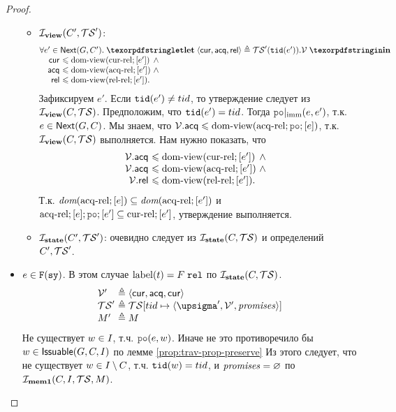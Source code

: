 \begin{proof}
\begin{itemize}
\begin{itemize}
        \item $\mathcal{I}_{\rm \bf view}(C', \mathcal{TS}')$:
          \[\inarr{
  \forall e' \in \nextset(G, C'). \; \letdef{\tup{\viewCur, \viewAcq, \viewfRel}}{\TSf'(\lTID(e')).\View}\\
  \quad
  \begin{array}{@{}r@{~}l@{~}l}
    \viewCur  & \le \domView(\curRel; [e']) & \land {} \\
    \viewAcq  & \le \domView(\acqRel; [e']) & \land {} \\
    \viewfRel & \le \domView(\relRel; [e']). \\
  \end{array}
          }\]
          Зафиксируем $e'$. Если ${\mathtt{tid}}(e') \neq tid$, то утверждение следует из $\mathcal{I}_{\rm \bf view}(C, \mathcal{TS})$.
          Предположим, что ${\mathtt{tid}}(e') = tid$. Тогда $\imm{\lPO}(e, e')$, т.к. $e \in {\sf Next}(G, C)$.
          Мы знаем, что $\View.\viewAcq \le \domView(\acqRel; \lPO; [e])$, т.к. $\mathcal{I}_{\rm \bf view}(C, \mathcal{TS})$ выполняется.
          Нам нужно показать, что
          \[\inarr{
  \begin{array}{@{}r@{~}l@{~}l}
    \View.\viewAcq  & \le \domView(\curRel; [e']) & \land {} \\
    \View.\viewAcq  & \le \domView(\acqRel; [e']) & \land {} \\
    \View.\viewfRel & \le \domView(\relRel; [e']). \\
  \end{array}
          }\]
          Т.к. $\textit{dom}{({{\rm acq\text{-}rel}; [e]})} \subseteq \textit{dom}{({{\rm acq\text{-}rel}; [e']})}$
          и $\acqRel;[e];\lPO;[e'] \suq \curRel; [e']$, утверждение выполняется.
        \item $\mathcal{I}_{\rm \bf state}(C', \mathcal{TS}')$:
          очевидно следует из $\mathcal{I}_{\rm \bf state}(C, \mathcal{TS})$ и определений $C', \mathcal{TS}'$.
      \end{itemize}

        \item $e \in {{\mathtt{F}}}(\mathtt{sy})$. В этом случае ${\rm label}(t) = F \; {\mathtt{rel}}$ по $\mathcal{I}_{\rm \bf state}(C, \mathcal{TS})$.
          \[\begin{array}{l@{~}l}
            \View'   & \defeq \tup{\viewCur, \viewAcq, \viewCur} \\
            \TSf'    & \defeq \TSf[tid \mapsto \tup{\pstate', \View', \PromSet}] \\
            M' & \defeq M \\
          \end{array}\]
          Не существует $w \in I$, т.ч. $\lPO(e, w)$. Иначе не
          это противоречило бы $w \in {\sf Issuable}(G, C, I)$ по лемме \ref{prop:trav-prop-preserve} 
          Из этого следует, что не существует $w \in I \setminus C$, т.ч. ${\mathtt{tid}}(w) = tid$, и
          $\mathit{promises} = \varnothing$ по $\mathcal{I}_{\rm \bf mem1}(C, I, \mathcal{TS}, M)$.
          

\end{itemize}
\end{proof}
